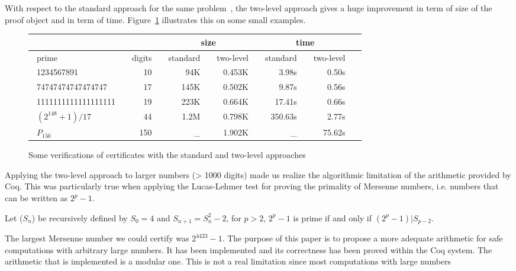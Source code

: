 With respect to the standard approach for the same problem~\cite{Caprotti_Oostdijk:01pockjsc}, the two-level
approach gives a huge improvement in term of size of the
proof object and in term of time.  Figure~\ref{fig:TimeComp} illustrates this
on some small examples.
\begin{figure}
\begin{center}
\begin{tabular}{|l|r|r|r|r|r|r|}
\cline{3-6}
\multicolumn{2}{c}{} & \multicolumn{2}{|c|}{size} &
                                               \multicolumn{2}{c|}{time} \\
\hline
~prime     ~     & \multicolumn{1}{c|}{~digits~ } & ~standard~  &
  \multicolumn{1}{c|}{ ~two-level~ } &
  \multicolumn{1}{c|}{ ~standard~ } &
  \multicolumn{1}{c|}{ ~two-level~ } \\
\hline
~1234567891       ~   & 10~ &  94K~ &  ~0.453K~ & 3.98s~  & 0.50s~  \\
~74747474747474747~   & 17~ & 145K~ &  0.502K~ &   9.87s~ & 0.56s~ \\
~1111111111111111111~ & 19~ & 223K~ &  0.664K~ & 17.41s~  & 0.66s~   \\
~$(2^{148}+1)/17$ ~   & 44~ & 1.2M~ & 0.798K~ & ~350.63s~  & 2.77s~   \\
~$P_{150}$   ~        &150~ &  \_~  & 1.902K~   &  \_~   & 75.62s~  \\
\hline
\end{tabular}
\end{center}
\caption{Some verifications of certificates with the standard and two-level approaches}
\label{fig:TimeComp}
\end{figure} 
Applying the two-level approach to larger numbers (> 1000 digits) made us realize
the algorithmic limitation of the arithmetic provided by {\sc Coq}.
This was particularly true when applying the Lucas-Lehmer test
for proving the primality of Mersenne numbers, i.e. numbers that can be written as $2 ^ p -1$.
\begin{theorem}\label{lucas}
Let ($S_n$) be recursively defined by $S_0= 4$ and $S_{n+1} = S_n^2 - 2$,
for $p > 2$, $2^p-1$ is prime if and only if $(2^p -1) | S_{p-2}$.
\end{theorem}
The largest Mersenne number we could certify was $2^{4423} - 1$. 
The purpose of this paper is to propose a more adequate arithmetic for safe 
computations with arbitrary large numbers. It has been implemented and its correctness
has been proved within the {\sc Coq} system. The arithmetic that is implemented is a modular
one. This is not a real limitation since most computations with large numbers

